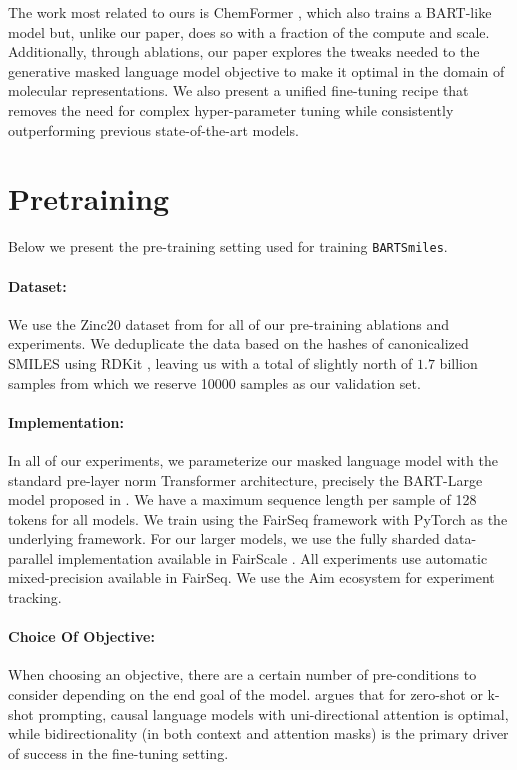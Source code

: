 \documentclass{article} %
\newcommand{\MODEL}{\texttt{BARTSmiles}}
\begin{document}
The work most related to ours is ChemFormer \citet{chemformer}, which also trains a BART-like model but, unlike our paper, does so with a fraction of the compute and scale. Additionally, through ablations, our paper explores the tweaks needed to the generative masked language model objective to make it optimal in the domain of molecular representations. We also present a unified fine-tuning recipe that removes the need for complex hyper-parameter tuning while consistently outperforming previous state-of-the-art models.



\section{Pretraining}
Below we present the pre-training setting used for training \MODEL{}.
\paragraph{Dataset:} We use the Zinc20 dataset from \citet{ZINC20} for all of our pre-training ablations and experiments. We deduplicate the data based on the hashes of canonicalized SMILES using RDKit \citep{RDKIT}, leaving us with a total of slightly north of $1.7$ billion samples from which we reserve 10000 samples as our validation set.

\paragraph{Implementation:}
\label{sec:model_implementation}
In all of our experiments, we parameterize our masked language model with the standard pre-layer norm Transformer architecture, precisely the BART-Large model proposed in \citet{BART}. We have a maximum sequence length per sample of 128 tokens for all models. We train using the FairSeq framework \citet{fairseq} with PyTorch \citet{pytorch} as the underlying framework. For our larger models, we use the fully sharded data-parallel implementation available in FairScale \citep{fairscale}. All experiments use automatic mixed-precision available in FairSeq. We use the Aim ecosystem \citep{AIM} for experiment tracking.


\paragraph{Choice Of Objective:}
When choosing an objective, there are a certain number of pre-conditions to consider depending on the end goal of the model. \citet{lm_objective_architecture} argues that for zero-shot or k-shot prompting, causal language models with uni-directional attention is optimal, while bidirectionality (in both context and attention masks) is the primary driver of success in the fine-tuning setting.
\end{document}
